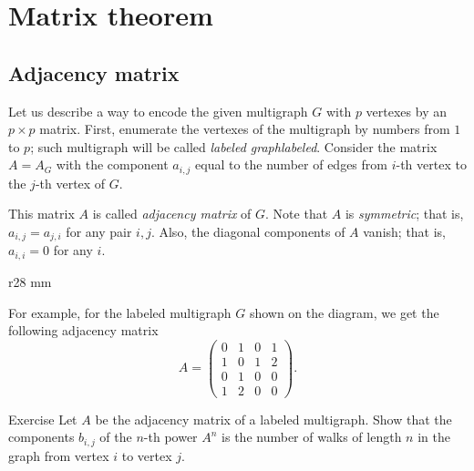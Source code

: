 \chapter{Matrix theorem}


\section*{Adjacency matrix}

Let us describe a way to encode the given multigraph $G$ with $p$ vertexes by an $p{\times}p$ matrix.
First, enumerate the vertexes of the multigraph by numbers from $1$ to $p$;
such multigraph will be called \emph{labeled graph}\emph{labeled}. 
Consider the matrix $A=A_G$ with the component $a_{i,j}$ equal to the number of edges from $i$-th vertex to the $j$-th vertex of $G$.

This matrix $A$ is called \emph{adjacency matrix} of $G$.
Note that $A$ is \emph{symmetric}; that is, $a_{i,j}=a_{j,i}$ for any pair $i,j$.
Also, the diagonal components of $A$ vanish; that is, $a_{i,i}=0$ for any $i$.

{

\begin{wrapfigure}{r}{28 mm}
\end{wrapfigure}


For example, for the labeled multigraph $G$ shown on the diagram, we get the following adjacency matrix 
\[A=\left(
\begin{matrix}
0&1&0&1
\\
1&0&1&2
\\
0&1&0&0
\\
1&2&0&0
\end{matrix}
\right).\]

}

\begin{thm}{Exercise}
Let $A$ be the adjacency matrix of a labeled multigraph.
Show that the components $b_{i,j}$ of the $n$-th power $A^n$ is the number of walks of length $n$ in the graph from vertex $i$ to vertex $j$. 
\end{thm}

